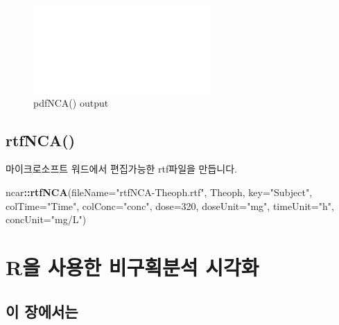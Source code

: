 \documentclass[12pt,]{krantz}
\newenvironment{Shaded}{\begin{snugshade}}{\end{snugshade}}
\newcommand{\DataTypeTok}[1]{\textcolor[rgb]{0.13,0.29,0.53}{#1}}
\newcommand{\DecValTok}[1]{\textcolor[rgb]{0.00,0.00,0.81}{#1}}
\newcommand{\KeywordTok}[1]{\textcolor[rgb]{0.13,0.29,0.53}{\textbf{#1}}}
\newcommand{\NormalTok}[1]{#1}
\newcommand{\OperatorTok}[1]{\textcolor[rgb]{0.81,0.36,0.00}{\textbf{#1}}}
\newcommand{\StringTok}[1]{\textcolor[rgb]{0.31,0.60,0.02}{#1}}
\begin{document}
\begin{figure}
\includegraphics[width=1\linewidth]{Output-ncar/montage} \caption{pdfNCA() output}\label{fig:pdfnca-output}
\end{figure}

\hypertarget{rtfnca}{%
\section{rtfNCA()}\label{rtfnca}}

마이크로소프트 워드에서 편집가능한 rtf파일을 만듭니다.

\begin{Shaded}
\begin{Highlighting}[]
\NormalTok{ncar}\OperatorTok{::}\KeywordTok{rtfNCA}\NormalTok{(}\DataTypeTok{fileName=}\StringTok{"rtfNCA-Theoph.rtf"}\NormalTok{, Theoph, }\DataTypeTok{key=}\StringTok{"Subject"}\NormalTok{, }
             \DataTypeTok{colTime=}\StringTok{"Time"}\NormalTok{, }\DataTypeTok{colConc=}\StringTok{"conc"}\NormalTok{, }\DataTypeTok{dose=}\DecValTok{320}\NormalTok{, }\DataTypeTok{doseUnit=}\StringTok{"mg"}\NormalTok{, }
             \DataTypeTok{timeUnit=}\StringTok{"h"}\NormalTok{, }\DataTypeTok{concUnit=}\StringTok{"mg/L"}\NormalTok{)}
\end{Highlighting}
\end{Shaded}

\hypertarget{pkr}{%
\chapter{R을 사용한 비구획분석 시각화}\label{pkr}}

\hypertarget{summary-pkr}{%
\section{이 장에서는}\label{summary-pkr}}
\end{document}
